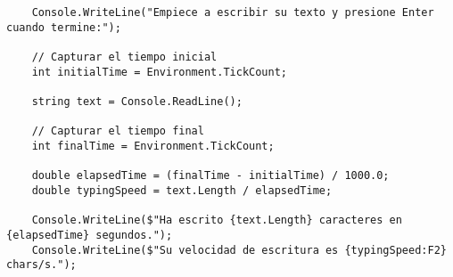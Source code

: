 \begin{lstlisting}
    Console.WriteLine("Empiece a escribir su texto y presione Enter cuando termine:");

    // Capturar el tiempo inicial
    int initialTime = Environment.TickCount;
    
    string text = Console.ReadLine();
    
    // Capturar el tiempo final
    int finalTime = Environment.TickCount;
    
    double elapsedTime = (finalTime - initialTime) / 1000.0;
    double typingSpeed = text.Length / elapsedTime;
    
    Console.WriteLine($"Ha escrito {text.Length} caracteres en {elapsedTime} segundos.");
    Console.WriteLine($"Su velocidad de escritura es {typingSpeed:F2} chars/s.");
\end{lstlisting}